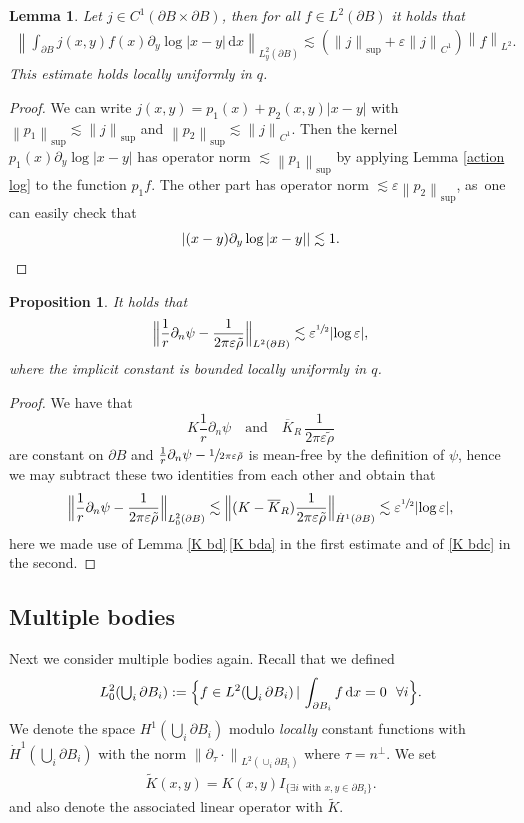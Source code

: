 \documentclass[10pt]{amsart}
\let\epsilon\varepsilon
\let\ts\textstyle
\newtheorem{proposition}[theorem]{Proposition}
\newtheorem{lemma}[theorem]{Lemma}
\theoremstyle{definition}
\newcommand\norm[1]{\left\lVert #1\right\rVert}
\newcommand\Bnorm[1]{\Bigl\lVert #1\Bigr\rVert}
\newcommand\eq{=}
\newcommand\dd{\,\mathrm{d}}
\newcommand\dx{\dd x}
\let\de\partial
\let\eps\epsilon
\begin{document}
\begin{lemma}\label{perturbed log}
Let $j\in C^1(\de B\times \de B)$, then for all $f\in L^2(\de B)$ it holds that
\begin{align*}
\norm{\int_{\de B} j(x,y)f(x)\de_y\log|x-y|\dx}_{L_y^2(\de B)}\lesssim \left(\norm{j}_{\sup}+\eps\norm{j}_{C^1}\right)\norm{f}_{L^2}.
\end{align*}
This estimate holds locally uniformly in $q$.
\end{lemma}
\begin{proof}
We can write $j(x,y)=p_1(x)+p_2(x,y)|x-y|$ with $\norm{p_1}_{\sup}\lesssim \norm{j}_{\sup}$ and $\norm{p_2}_{\sup}\lesssim \norm{j}_{C^1}$. Then the kernel $p_1(x)\de_y\log|x-y|$ has operator norm $\lesssim \norm{p_1}_{\sup}$ by applying Lemma \ref{action log} to the function $p_1f$. The other part has operator norm $\lesssim \eps\norm{p_2}_{\sup}$, as~one can easily check that
\[
|(x-y)\de_y\log|x-y||\lesssim 1.\qedhere
\]
\end{proof}

\begin{proposition}\label{est single body}
It holds that
\begin{align*}
\Bnorm{\frac{1}{r}\de_n\psi-\frac{1}{2\pi \eps\tilde{\rho}}}_{L^2(\de B)}\lesssim \eps^{\sfrac{1}{2}}|{\log\eps}|,
\end{align*}
where the implicit constant is bounded locally uniformly in $q$.
\end{proposition}

\begin{proof}
We have that 
\[
K\frac{1}{r}\de_n\psi\quad\text{and}\quad\overline K_R\,\frac{1}{2\pi\eps\tilde{\rho}}
\]
are constant on $\de B$ and $\frac{1}{r}\de_n\psi-\sfrac{1}{2\pi \eps\tilde{\rho}}$ is mean-free by the definition of $\psi$, hence we may subtract these two identities from each other and obtain that
\begin{align*}
\Bnorm{\frac{1}{r}\de_n\psi-\frac{1}{2\pi \eps\tilde{\rho}}}_{L_0^2(\de B)}\lesssim \Bnorm{(K-\overline{K}_R)\frac{1}{2\pi \eps\tilde{\rho}}}_{\dot{H}^1(\de B)}\lesssim \eps^{\sfrac{1}{2}}|{\log\eps}|,
\end{align*}
here we made use of Lemma \ref{K bd}\,\eqref{K bda} in the first estimate and of \eqref{K bdc} in the second.
\end{proof}

\subsection{Multiple bodies}
Next we consider multiple bodies again. Recall that we defined
\[
L_0^2({\ts\bigcup_i \de B_i}):=\Bigl\{f\in L^2({\ts\bigcup_i\de B_i})\,|\,\int_{\de B_i} f\dx\eq 0\:\:\:\forall i\Bigr\}.
\]
We denote the space $H^1(\bigcup_i \de B_i)$ modulo \emph{locally} constant functions with $\dot{H}^1(\bigcup_i\de B_i)$ with the norm $\norm{\de_\tau\cdot}_{L^2(\cup_i\de B_i)}$ where $\tau=n^\perp$.
We set
\begin{align*}
\tilde{K}(x,y)\eq K(x,y)I_{\{\exists i\text{ with } x,y\in \de B_i\}}.
\end{align*}
and also denote the associated linear operator with $\tilde{K}$.
\end{document}
